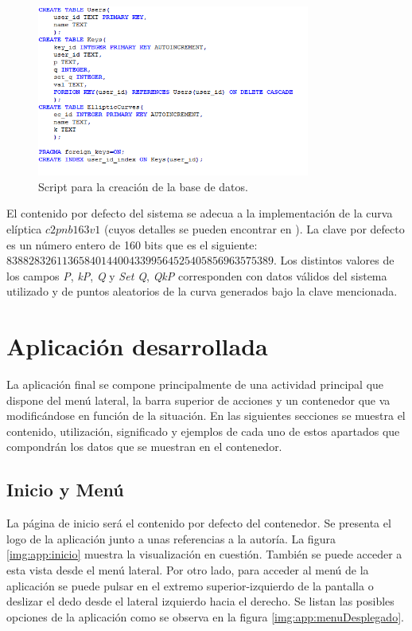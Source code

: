 \documentclass[../PFC.tex]{subfiles}
\begin{document}
\begin{figure}[H]
  \centering
  \includegraphics[width=0.8\textwidth]{./img/databaseScript}
  \caption{Script para la creación de la base de datos.}
  \label{img:databaseScript}
\end{figure}

El contenido por defecto del sistema se adecua a la implementación de la curva elíptica \(c2pnb163v1\) (cuyos detalles se pueden encontrar en \cite{definicionCurvasF2M}). La clave por defecto es un número entero de 160 bits que es el siguiente: \(838828326113658401440043399564525405856963575389\). Los distintos valores de los campos \textit{P}, \textit{kP}, \textit{Q} y \textit{Set Q}, \textit{QkP} corresponden con datos válidos del sistema utilizado y de puntos aleatorios de la curva generados bajo la clave mencionada.

\section{Aplicación desarrollada}
\label{App:Aplicación desarrollada}

La aplicación final se compone principalmente de una actividad principal que dispone del menú lateral, la barra superior de acciones y un contenedor que va modificándose en función de la situación. En las siguientes secciones se muestra el contenido, utilización, significado y ejemplos de cada uno de estos apartados que compondrán los datos que se muestran en el contenedor.

\subsection{Inicio y Menú}
\label{App:AD:InicioyMenú}

La página de inicio será el contenido por defecto del contenedor. Se presenta el logo de la aplicación junto a unas referencias a la autoría. La figura \ref{img:app:inicio} muestra la visualización en cuestión. También se puede acceder a esta vista desde el menú lateral. Por otro lado, para acceder al menú de la aplicación se puede pulsar en el extremo superior-izquierdo de la pantalla o deslizar el dedo desde el lateral izquierdo hacia el derecho. Se listan las posibles opciones de la aplicación como se observa en la figura \ref{img:app:menuDesplegado}.
\end{document}
